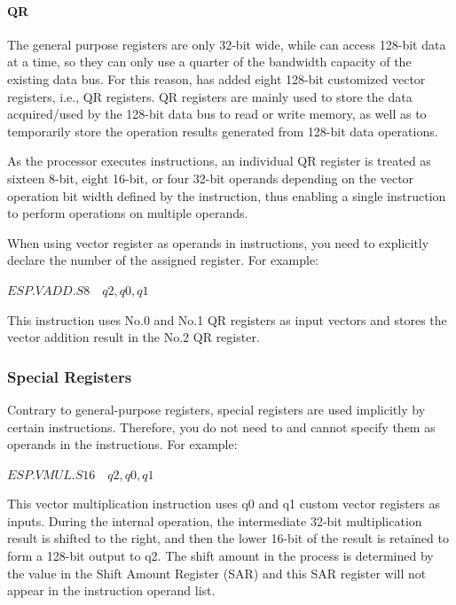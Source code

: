 \documentclass[main\_\_EN.tex]{subfiles}
\begin{document}
\paragraph{QR}

The general purpose registers are only 32-bit wide, while \chipname{} can access 128-bit data at a time, so they can only use a quarter of the bandwidth capacity of the existing data bus. For this reason, \chipname{} has added eight 128-bit customized vector registers, i.e., QR registers. QR registers are mainly used to store the data acquired/used by the 128-bit data bus to read or write memory, as well as to temporarily store the operation results generated from 128-bit data operations.

As the processor executes instructions, an individual QR register is treated as sixteen 8-bit, eight 16-bit, or four 32-bit operands depending on the vector operation bit width defined by the instruction, thus enabling a single instruction to perform operations on multiple operands.

When using vector register as operands in instructions, you need to explicitly declare the number of the assigned register. For example:

\begin{center}
$\hyperref[instruction:ESPVADDS8]{ESP.VADD.S8} \hspace{1em} q2, q0, q1$
\end{center}

This instruction uses No.0 and No.1 QR registers as input vectors and stores the vector addition result in the No.2 QR register.

\subsubsection{Special Registers}
\label{sec:pie-spec-reg}

Contrary to general-purpose registers, special registers are used implicitly by certain instructions. Therefore, you do not need to and cannot specify them as operands in the instructions. For example:

\begin{center}
    $\hyperref[instruction:ESPVMULS16]{ESP.VMUL.S16}\hspace{1em}q2, q0, q1$
\end{center}

This vector multiplication instruction uses q0 and q1 custom vector registers as inputs. During the internal operation, the intermediate 32-bit multiplication result is shifted to the right, and then the lower 16-bit of the result is retained to form a 128-bit output to q2. The shift amount in the process is determined by the value in the Shift Amount Register (SAR) and this SAR register will not appear in the instruction operand list.
\end{document}
